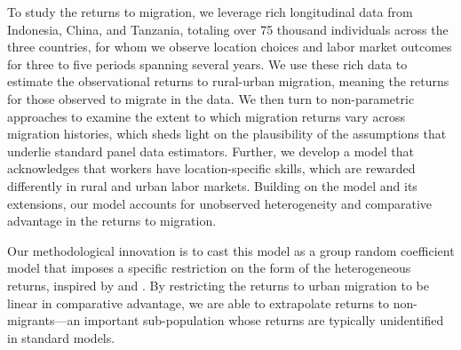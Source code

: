 
To study the returns to migration, we leverage rich longitudinal data from Indonesia, China, and Tanzania, totaling over 75 thousand individuals across the three countries, for whom we observe location choices and labor market outcomes for three to five periods spanning several years.
We use these rich data to estimate the observational returns to rural-urban migration, meaning the returns for those observed to migrate in the data.
We then turn to non-parametric approaches to examine the extent to which migration returns vary across migration histories, which sheds light on the plausibility of the assumptions that underlie standard panel data estimators. 
Further, we develop a model that acknowledges that workers have location-specific skills, which are rewarded differently in rural and urban labor markets.
Building on the \cite{royThoughtsDistributionEarnings1951} model and its extensions, our model accounts for unobserved heterogeneity and comparative advantage in the returns to migration.

Our methodological innovation is to cast this model as a group random coefficient model that imposes a specific restriction on the form of the heterogeneous returns, inspired by \cite{suriSelectionComparativeAdvantage2011} and \cite{tjernstromCommentSuri2011}.
By restricting the returns to urban migration to be linear in comparative advantage, we are able to extrapolate returns to non-migrants---an important sub-population whose returns are typically unidentified in standard models. 


